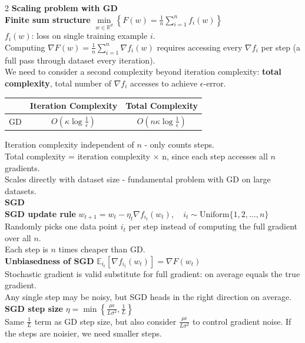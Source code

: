 \documentclass[10pt]{article}
\begin{document}
\begin{multicols*}{2}
\textbf{Scaling problem with GD}\\
\textbf{Finite sum structure}
$\min\limits_{w \in \mathbb{R}^d} \left\{ F(w) = \frac{1}{n}\sum_{i=1}^{n} f_i(w) \right\}$\\
$f_i(w)$: loss on single training example $i$.\\
Computing $\nabla F(w) = \frac{1}{n} \sum_{i=1}^{n} \nabla f_i(w)$ requires accessing every $\nabla f_i$ per step (a full pass through dataset every iteration).\\
We need to consider a second complexity beyond iteration complexity: \textbf{total complexity}, total number of $\nabla f_i$ accesses to achieve $\epsilon$-error.\\

\begin{tabular}{|c|c|c|}
\hline
& Iteration Complexity & Total Complexity \\
\hline
GD & $O\left(\kappa\log\frac{1}{\epsilon}\right)$ & $O\left(n\kappa\log\frac{1}{\epsilon}\right)$ \\
\hline
\end{tabular}
Iteration complexity independent of $n$ - only counts steps.\\
Total complexity = iteration complexity $\times$ n, since each step accesses all $n$ gradients.\\
Scales directly with dataset size - fundamental problem with GD on large datasets.\\[\baselineskip]
\textbf{SGD}\\
\textbf{SGD update rule}
$w_{t+1} = w_t - \eta_t \nabla f_{i_t}(w_t), \quad i_t \sim \text{Uniform}\{1, 2, \dots, n\}$\\
Randomly picks one data point $i_t$ per step instead of computing the full gradient over all $n$.\\
Each step is $n$ times cheaper than GD.\\
\textbf{Unbiasedness of SGD}
$\mathbb{E}_{i_t}[\nabla f_{i_t}(w_t)] = \nabla F(w_t)$\\
Stochastic gradient is valid substitute for full gradient: on average equals the true gradient.\\
Any single step may be noisy, but SGD heads in the right direction on average.\\
\textbf{SGD step size}
$\eta = \min\left\{\frac{\mu\epsilon}{L\sigma^2}, \frac{1}{L}\right\}$\\
Same $\frac{1}{L}$ term as GD step size, but also consider $\frac{\mu\epsilon}{L\sigma^2}$ to control gradient noise. If the steps are noisier, we need smaller steps.\\

\end{multicols*}
\end{document}
